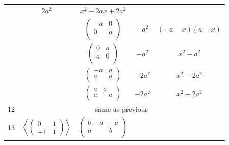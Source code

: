 \documentclass[a4paper,12pt]{amsart}
\begin{document}
\begin{table}[h]
\begin{tabular}{|c|c|c|c|c|}
			&   $2a^2$   &   $x^2 - 2ax + 2a^2$                \\
			
			
			& & $\begin{pmatrix}
				-a & 0 \\        
				0 & a \\
			\end{pmatrix}$
			
			&  $-a^2$   &       $(-a - x)(a - x)$     \\
			
			
			& &  $\begin{pmatrix}
				0 & a \\        
			    a & 0 \\
			\end{pmatrix}$
			
			&   $-a^2$     &       $x^2 - a^2$                         \\
			
			& &  $\begin{pmatrix}
				-a & a \\        
				a & a \\
			\end{pmatrix}$
			
			&   $-2a^2$     &       $x^2 - 2a^2$                       \\
			
			& &  $\begin{pmatrix}
				a & a \\        
				a & -a \\
			\end{pmatrix}$
			
			&   $-2a^2$     &       $x^2 - 2a^2$                      \\
			
			\hline
			12 & \multicolumn{4}{|c|}{same as previous} \\ 
			\hline
			
			\multirow{2}{*}{13}
			& \multirow{2}{*}{
				$\left\langle 
				\begin{pmatrix}
					0 & 1 \\ 
					-1 & 1 
				\end{pmatrix} 
				\right\rangle$	
			}	
			&  $\begin{pmatrix}
				b-a & -a \\        
				a & b \\
			\end{pmatrix}$
			

\end{tabular}
\end{table}
\end{document}

